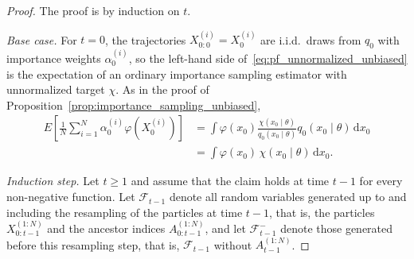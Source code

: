 \begin{proof}
    The proof is by induction on $t$.

    \emph{Base case.} For $t=0$, the trajectories $X_{0:0}^{(i)} = X_0^{(i)}$ are i.i.d.\ draws from $q_0$ with importance weights $\alpha_0^{(i)}$, so the left-hand side of~\eqref{eq:pf_unnormalized_unbiased} is the expectation of an ordinary importance sampling estimator with unnormalized target $\chi$. As in the proof of Proposition~\ref{prop:importance_sampling_unbiased},
    \begin{align}
        E\left[\frac{1}{N}\sum_{i=1}^{N} \alpha_0^{(i)}\varphi(X_0^{(i)})\right] &= \int \varphi(x_0)\frac{\chi(x_0\mid\theta)}{q_0(x_0\mid\theta)}q_0(x_0\mid\theta)\,\mathrm{d}x_0 \\
        &= \int \varphi(x_0)\,\chi(x_0\mid\theta)\,\mathrm{d}x_0.
    \end{align}

    \emph{Induction step.} Let $t\ge 1$ and assume that the claim holds at time $t-1$ for every non-negative function. Let $\mathcal{F}_{t-1}$ denote all random variables generated up to and including the resampling of the particles at time $t-1$, that is, the particles $X_{0:t-1}^{(1:N)}$ and the ancestor indices $A_{0:t-1}^{(1:N)}$, and let $\mathcal{F}_{t-1}^{-}$ denote those generated before this resampling step, that is, $\mathcal{F}_{t-1}$ without $A_{t-1}^{(1:N)}$.


\end{proof}
